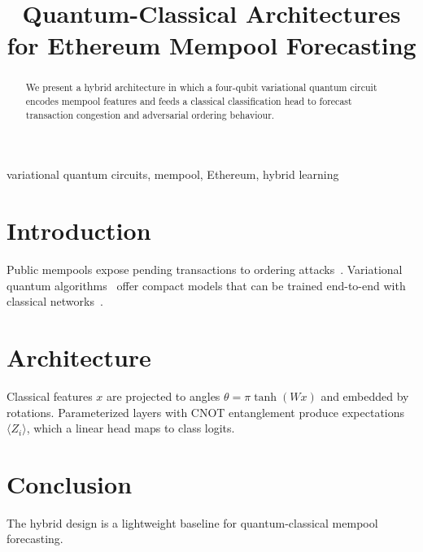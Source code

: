 \documentclass[conference]{IEEEtran}
\begin{document}
\title{Quantum-Classical Architectures for Ethereum Mempool Forecasting}
\author{}
\maketitle

\begin{abstract}
We present a hybrid architecture in which a four-qubit variational quantum circuit
encodes mempool features and feeds a classical classification head to forecast
transaction congestion and adversarial ordering behaviour.
\end{abstract}

\begin{IEEEkeywords}
variational quantum circuits, mempool, Ethereum, hybrid learning
\end{IEEEkeywords}

\section{Introduction}
Public mempools expose pending transactions to ordering attacks~\cite{daian2020flash}.
Variational quantum algorithms~\cite{cerezo2021variational} offer compact models that
can be trained end-to-end with classical networks~\cite{bergholm2018pennylane}.

\section{Architecture}
Classical features $x$ are projected to angles $\theta=\pi\tanh(Wx)$ and embedded by
rotations. Parameterized layers with CNOT entanglement produce expectations
$\langle Z_i\rangle$, which a linear head maps to class logits.

\section{Conclusion}
The hybrid design is a lightweight baseline for quantum-classical mempool forecasting.



\end{document}
